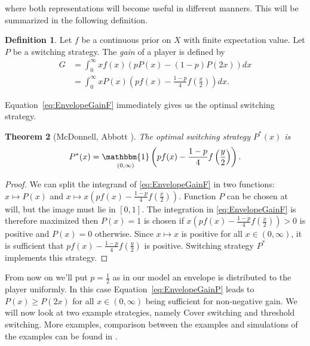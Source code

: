 \documentclass[a4paper]{report}
\theoremstyle{plain}
\newtheorem{theorem}{Theorem}[section]
\theoremstyle{definition}
\newtheorem{definition}[theorem]{Definition}
\theoremstyle{remark}
\numberwithin{equation}{chapter}
\DeclareMathOperator{\1}{\mathbbm{1}}
\begin{document}
where both representations will become useful in different manners. This will be summarized in the following definition.
\begin{definition}
Let $f$ be a continuous prior on $X$ with finite expectation value. Let $P$ be a switching strategy. The \emph{gain} of a player is defined by
\begin{align}
G&=\int_0^\infty xf(x)(pP(x)-(1-p)P(2x))dx\label{eq:EnvelopeGainP}\\
&=\int_0^\infty xP(x)\left(pf(x)-\frac{1-p}{4}f\left(\frac{x}{2}\right)\right)dx.\label{eq:EnvelopeGainF}
\end{align}
\end{definition}
Equation~\ref{eq:EnvelopeGainF} immediately gives us the optimal switching strategy.
\begin{theorem}[McDonnell, Abbott \cite{McDonnell09}]\label{thm:switchopt}
The optimal switching strategy $P^*(x)$ is
\begin{equation}
P^*(x)=\1_{(0,\infty)}\left(pf(x)-\frac{1-p}{4}f\left(\frac{y}{2}\right)\right).\end{equation}
\end{theorem}
\begin{proof}
We can split the integrand of \eqref{eq:EnvelopeGainF} in two functions: $x\mapsto P(x)$ and $x\mapsto x\left(pf(x)-\frac{1-p}{4}f\left(\frac{x}{2}\right)\right)$. Function $P$ can be chosen at will, but the image must lie in $[0,1]$. The integration in \eqref{eq:EnvelopeGainF} is therefore maximized then $P(x)=1$ is chosen if $x\left(pf(x)-\frac{1-p}{4}f\left(\frac{x}{2}\right)\right)>0$ is positive and $P(x)=0$ otherwise. Since $x\mapsto x$ is positive for all $x\in(0,\infty)$, it is sufficient that $pf(x)-\frac{1-p}{4}f\left(\frac{y}{2}\right)$ is positive. Switching strategy $P^*$ implements this strategy.
\end{proof}

From now on we'll put $p=\frac{1}{2}$ as in our model an envelope is  distributed to the player uniformly. In this case Equation~\ref{eq:EnvelopeGainP} leads to $P(x)\geq P(2x)$ for all $x\in(0,\infty)$ being sufficient for non-negative gain. We will now look at two example strategies, namely Cover switching and threshold switching. More examples, comparison between the examples and simulations of the examples can be found in \cite{McDonnell09,McDonnell11}.
\end{document}
